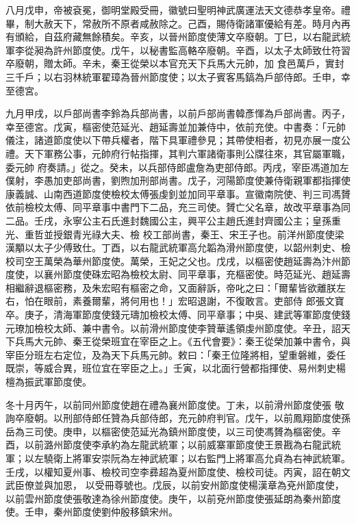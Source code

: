 \begin{pinyinscope}
 八月戊申，帝被袞冕，御明堂殿受冊，徽號曰聖明神武廣運法天文德恭孝皇帝。禮畢，制大赦天下，常赦所不原者咸赦除之。己酉，賜侍衛諸軍優給有差。時月內再有頒給，自茲府藏無餘積矣。辛亥，以晉州節度使薄文卒廢朝。丁巳，以右龍武統軍李從昶為許州節度使。戊午，以秘書監高輅卒廢朝。辛酉，以太子太師致仕符習卒廢朝，贈太師。辛未，秦王從榮以本官充天下兵馬大元帥，加
 食邑萬戶，實封三千戶；以右羽林統軍翟璋為晉州節度使；以太子賓客馬鎬為戶部侍郎。壬申，幸至德宮。



 九月甲戌，以戶部尚書李鈴為兵部尚書，以前戶部尚書韓彥惲為戶部尚書。丙子，幸至德宮。戊寅，樞密使范延光、趙延壽並加兼侍中，依前充使。中書奏：「元帥儀注，諸道節度使以下帶兵權者，階下具軍禮參見；其帶使相者，初見亦展一度公禮。天下軍務公事，元帥府行帖指揮，其判六軍諸衛事則公牒往來，其官屬軍職，委元帥
 府奏請。」從之。癸未，以兵部侍郎盧詹為吏部侍郎。丙戌，宰臣馮道加左僕射，李愚加吏部尚書，劉煦加刑部尚書。戊子，河陽節度使兼侍衛親軍都指揮使康義誠、山南西道節度使檢校太傅張虔釗並加同平章事。宣徽南院使、判三司馮贇依前檢校太傅、同平章事中書門下二品，充三司使。贇亡父名章，故改平章事為同二品。壬戌，永寧公主石氏進封魏國公主，興平公主趙氏進封齊國公主；皇孫重光、重哲並授銀青光祿大夫、檢
 校工部尚書，秦王、宋王子也。前洋州節度使梁漢顒以太子少傅致仕。丁酉，以右龍武統軍高允韜為滑州節度使，以韶州刺史、檢校司空王萬榮為華州節度使。萬榮，王妃之父也。戊戌，以樞密使趙延壽為汴州節度使，以襄州節度使硃宏昭為檢校太尉、同平章事，充樞密使。時范延光、趙延壽相繼辭退樞密務，及朱宏昭有樞密之命，又面辭訴，帝叱之曰：「爾輩皆欲離朕左右，怕在眼前，素養爾輩，將何用也！」宏昭退謝，不復敢言。吏部侍
 郎張文寶卒。庚子，清海軍節度使錢元璹加檢校太傅、同平章事；中吳、建武等軍節度使錢元璙加檢校太師、兼中書令。以前滑州節度使李贊華遙領虔州節度使。辛丑，詔天下兵馬大元帥、秦王從榮班宜在宰臣之上。《五代會要》：秦王從榮加兼中書令，與宰臣分班左右定位，及為天下兵馬元帥。敕曰：「秦王位隆將相，望重磐維，委任既崇，等威合異，班位宜在宰臣之上。」壬寅，以北面行營都指揮使、易州刺史楊檀為振武軍節度使。



 冬十月丙午，以前同州節度使趙在禮為襄州節度使。丁未，以前滑州節度使張
 敬詢卒廢朝。以刑部侍郎任贊為兵部侍郎，充元帥府判官。戊午，以前鳳翔節度使孫岳為三司使。庚申，以樞密使范延光為鎮州節度使，以三司使馮贇為樞密使。辛酉，以前潞州節度使李承約為左龍武統軍；以前威寨軍節度使王景戡為右龍武統軍；以左驍衛上將軍安崇阮為左神武統軍；以右監門上將軍高允貞為右神武統軍。壬戌，以權知夏州事、檢校司空李彞超為夏州節度使、檢校司徒。丙寅，詔在朝文武臣僚並與加恩，
 以受冊尊號也。戊辰，以前安州節度使楊漢章為兗州節度使，以前雲州節度使張敬達為徐州節度使。庚午，以前兗州節度使張延朗為秦州節度使。壬申，秦州節度使劉仲殷移鎮宋州。




\end{pinyinscope}
